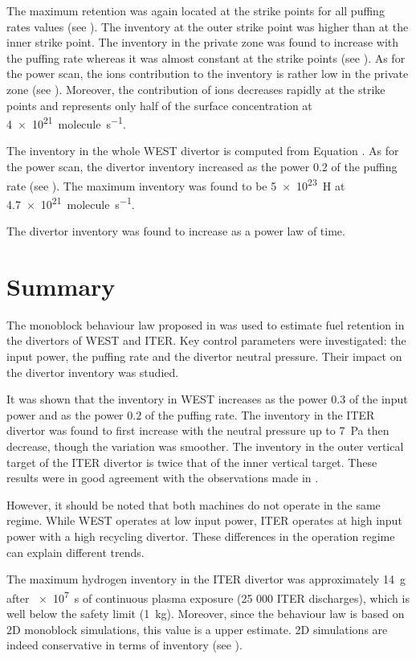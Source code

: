 The maximum retention was again located at the strike points for all puffing rates values (see ).
The inventory at the outer strike point was higher than at the inner strike point.
The inventory in the private zone was found to increase with the puffing rate whereas it was almost constant at the strike points (see ).
As for the power scan, the ions contribution to the inventory is rather low in the private zone (see ).
Moreover, the contribution of ions decreases rapidly at the strike points and represents only half of the surface concentration at \SI{4e21}{molecule.s^{-1}}.

The inventory in the whole WEST divertor is computed from Equation .
As for the power scan, the divertor inventory increased as the power 0.2 of the puffing rate (see ).
The maximum inventory was found to be \SI{5e23}{H} at \SI{4.7e21}{molecule.s^{-1}}.

The divertor inventory was found to increase as a power law of time.

\section{Summary}


The monoblock behaviour law proposed in  was used to estimate fuel retention in the divertors of WEST and ITER.
Key control parameters were investigated: the input power, the puffing rate and the divertor neutral pressure.
Their impact on the divertor inventory was studied.

It was shown that the inventory in WEST increases as the power $0.3$ of the input power and as the power $0.2$ of the puffing rate.
The inventory in the ITER divertor was found to first increase with the neutral pressure up to \SI{7}{Pa} then decrease, though the variation was smoother.
The inventory in the outer vertical target of the ITER divertor is twice that of the inner vertical target.
These results were in good agreement with the observations made in .

However, it should be noted that both machines do not operate in the same regime.
While WEST operates at low input power, ITER operates at high input power with a high recycling divertor.
These differences in the operation regime can explain different trends.

The maximum hydrogen inventory in the ITER divertor was approximately \SI{14}{g} after \SI{e7}{s} of continuous plasma exposure (25 000 ITER discharges), which is well below the safety limit (\SI{1}{kg}).
Moreover, since the behaviour law is based on 2D monoblock simulations, this value is a upper estimate.
2D simulations are indeed conservative in terms of inventory (see ).

